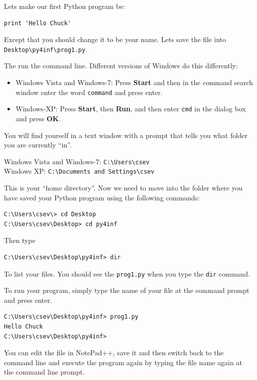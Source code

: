 \documentclass[10pt]{book}
\begin{document}
Lets make our first Python program be:

\beforeverb
\begin{verbatim}
print 'Hello Chuck'
\end{verbatim}
\afterverb
%
Except that you should change it to be your name.  Lets
save the file into {\tt Desktop{\textbackslash}py4inf{\textbackslash}prog1.py}.

The run the command line.  Different versions of Windows
do this differently:

\begin{itemize}
\item Windows Vista and Windows-7: Press {\bf Start}
and then in the command search window enter the word
{\tt command} and press enter.

\item Windows-XP: Press {\bf Start}, then {\bf Run}, and 
then enter {\tt cmd} in the dialog box and press {\bf OK}.
\end{itemize}

You will find yourself in a text window with a prompt that
tells you what folder you are currently ``in''.  

Windows Vista and Windows-7: {\tt C:{\textbackslash}Users{\textbackslash}csev}\\
Windows XP: {\tt C:{\textbackslash}Documents and Settings{\textbackslash}csev}

This is your ``home directory''.  Now we need to move into 
the folder where you have saved your Python program using
the following commands:

\beforeverb
\begin{verbatim}
C:\Users\csev\> cd Desktop
C:\Users\csev\Desktop> cd py4inf
\end{verbatim}
\afterverb
%
Then type 

\beforeverb
\begin{verbatim}
C:\Users\csev\Desktop\py4inf> dir 
\end{verbatim}
\afterverb
%
To list your files.  You should see the {\tt prog1.py} when 
you type the {\tt dir} command.

To run your program, simply type the name of your file at the 
command prompt and press enter.

\beforeverb
\begin{verbatim}
C:\Users\csev\Desktop\py4inf> prog1.py
Hello Chuck
C:\Users\csev\Desktop\py4inf> 
\end{verbatim}
\afterverb
%
You can edit the file in NotePad++, save it and then switch back
to the command line and execute the program again by typing
the file name again at the command line prompt.
\end{document}

